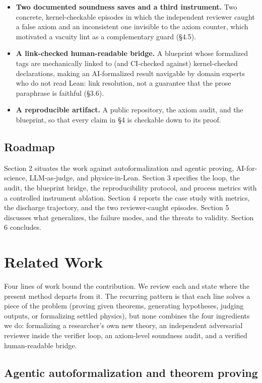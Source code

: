 \documentclass[11pt]{article}
\begin{document}
\begin{itemize}
  \item \textbf{Two documented soundness saves and a third instrument.} Two concrete, kernel-checkable episodes in which the independent reviewer caught a false axiom and an inconsistent one invisible to the axiom counter, which motivated a vacuity lint as a complementary guard (§4.5).
  \item \textbf{A link-checked human-readable bridge.} A blueprint whose formalized tags are mechanically linked to (and CI-checked against) kernel-checked declarations, making an AI-formalized result navigable by domain experts who do not read Lean: link resolution, not a guarantee that the prose paraphrase is faithful (§3.6).
  \item \textbf{A reproducible artifact.} A public repository, the axiom audit, and the blueprint, so that every claim in §4 is checkable down to its proof.
\end{itemize}

\subsection{Roadmap}

Section 2 situates the work against autoformalization and agentic proving, AI-for-science,
LLM-as-judge, and physics-in-Lean. Section 3 specifies the loop, the audit, the blueprint bridge,
the reproducibility protocol, and process metrics with a controlled instrument ablation. Section 4
reports the case study with metrics, the discharge
trajectory, and the two reviewer-caught episodes. Section 5 discusses what generalizes, the failure
modes, and the threats to validity. Section 6 concludes.

\section{Related Work}

Four lines of work bound the contribution. We review each and state where the present method
departs from it. The recurring pattern is that each line solves a piece of the problem (proving
given theorems, generating hypotheses, judging outputs, or formalizing settled physics), but none
combines the four ingredients we do: formalizing a researcher's own new theory, an independent
adversarial reviewer inside the verifier loop, an axiom-level soundness audit, and a verified
human-readable bridge.

\subsection{Agentic autoformalization and theorem proving}
\end{document}
